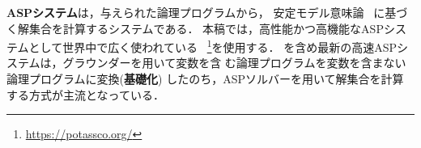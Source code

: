 \textbf{ASPシステム}は，与えられた論理プログラムから，
安定モデル意味論~\cite{Gelfond88:iclp}
に基づく解集合を計算するシステムである．
本稿では，高性能かつ高機能なASPシステムとして世界中で広く使われている
{\clingo}~\footnote{\url{https://potassco.org/}}を使用する．
{\clingo}を含め最新の高速ASPシステムは，グラウンダーを用いて変数を含
む論理プログラムを変数を含まない論理プログラムに変換(\textbf{基礎化})
したのち，ASPソルバーを用いて解集合を計算する方式が主流となっている．

%




